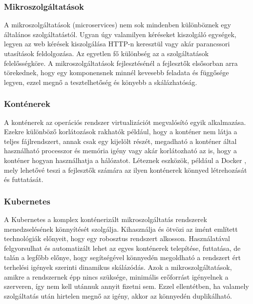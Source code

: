 \subsubsection{Mikroszolgáltatások}
A mikroszolgáltatások (microservices) nem sok mindenben különböznek egy általános szolgáltatástól. 
Ugyan úgy valamilyen kéréseket kiszolgáló egységek, legyen az web kérések kiszolgálása HTTP-n keresztül
vagy akár parancssori utasítások feldolgozása. Az egyetlen fő különbség az a szolgáltatások felelősségköre.
A mikroszolgáltatások fejlesztésénél a fejlesztők elsősorban arra törekednek, hogy egy komponensnek minnél kevesebb feladata és függősége legyen, 
ezzel megnő a tesztelhetőség és könyebb a skálázhatóság.

\subsubsection{Konténerek}
A konténerek az operációs rendszer virtualizációt megvalósító egyik alkalmazása. 
Ezekre különböző korlátozások rakhatók például, hogy a konténer nem látja a teljes fájlrendszert, annak csak egy kijelölt részét,
megadható a konténer által használható processzor és memória igény vagy akár korlátozható az is, hogy a konténer hogyan használhatja a hálózatot.
Léteznek eszközök, például a Docker \cite{docker}, mely lehetővé teszi a fejlesztők számára az ilyen konténerek könnyed létrehozását és futtatását.

\subsubsection{Kubernetes}
A Kubernetes \cite{kubernetes} a komplex konténerizált mikroszolgáltatás rendszerek menedzselésének könnyítését szolgálja.
Kihasználja és ötvözi az imént említett technológiák előnyeit, hogy egy robosztus rendszert alkosson. 
Használatával felgyorsulhat és automatizált lehet az egyes konténerek telepítése, futtatása, de talán a legfőbb előnye,
hogy segítségével könnyedén megoldható a rendszert ért terhelési igények szerinti dinamikus skálázódás. 
Azok a mikroszolgáltatások, amikre a rendszernek épp nincs szüksége, minimális erőforrást igényelnek a szerveren,
így nem kell utánnuk annyit fizetni sem. Ezzel ellentétben, ha valamely szolgáltatás után hirtelen megnő az igény,
akkor az könnyedén duplikálható.

